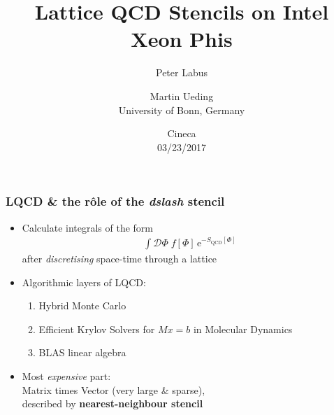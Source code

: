 \documentclass{beamer}
\begin{document}
\allowdisplaybreaks[1]

\title{Lattice QCD Stencils on Intel Xeon Phis}
\author{Peter Labus \and Martin Ueding \\[2ex] University of Bonn, Germany}
  \date{Cineca \\ 03/23/2017}


  \begin{frame}
    \titlepage
  \end{frame}


  \begin{frame}
    \frametitle{LQCD \& the r\^ole of the \textit{dslash} stencil}

    \begin{itemize}
      \item  Calculate integrals of the form
        \begin{align*}
          \int \mathcal D \Phi \; f[\Phi] \, \mathrm e^{-S_\text{QCD}[\Phi]}
        \end{align*}
        after \textit{discretising} space-time through a lattice
        \vfill

      \item Algorithmic layers of LQCD:
        \begin{enumerate}
          \item Hybrid Monte Carlo
          \item Efficient Krylov Solvers for $Mx=b$ in Molecular Dynamics
          \item BLAS linear algebra
        \end{enumerate}
        \vfill

      \item Most \textit{expensive} part:\\[1mm]
        \hspace{2mm} Matrix times Vector (very large \& sparse),\\
        \hspace{2mm} described by \textbf{nearest-neighbour stencil}
        \vfill
    \end{itemize}

  \end{frame}

\end{document}
